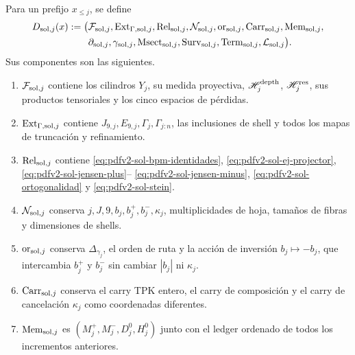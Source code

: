 Para un prefijo \(x_{\leq j}\), se define
\begin{equation}\label{eq:pdfv2-sol-d-package}
 \begin{aligned}
 D_{{\rm sol},j}(x):=\bigl(&
 \mathcal F_{{\rm sol},j},
 \operatorname{Ext}_{\Gamma,{\rm sol},j},
 \operatorname{Rel}_{{\rm sol},j},
 \mathcal N_{{\rm sol},j},
 \operatorname{or}_{{\rm sol},j},
 \operatorname{Carr}_{{\rm sol},j},
 \operatorname{Mem}_{{\rm sol},j},\\
 &\partial_{{\rm sol},j},
 \gamma_{{\rm sol},j},
 \operatorname{Msect}_{{\rm sol},j},
 \operatorname{Surv}_{{\rm sol},j},
 \operatorname{Term}_{{\rm sol},j},
 \mathcal L_{{\rm sol},j}\bigr).
 \end{aligned}
\end{equation}
Sus componentes son las siguientes.
\begin{enumerate}
 \item \(\mathcal F_{{\rm sol},j}\) contiene los cilindros \(Y_j\), su medida
       proyectiva, \(\mathscr H_j^{\rm depth}\),
       \(\mathscr H_j^{\rm res}\), sus productos tensoriales y los cinco
       espacios de pérdidas.
 \item \(\operatorname{Ext}_{\Gamma,{\rm sol},j}\) contiene
       \(J_{9,j},E_{9,j},\Gamma_j,\Gamma_{j:n}\), las inclusiones de shell y
       todos los mapas de truncación y refinamiento.
 \item \(\operatorname{Rel}_{{\rm sol},j}\) contiene
       \eqref{eq:pdfv2-sol-bpm-identidades},
       \eqref{eq:pdfv2-sol-ej-projector},
       \eqref{eq:pdfv2-sol-jensen-plus}--
       \eqref{eq:pdfv2-sol-jensen-minus},
       \eqref{eq:pdfv2-sol-ortogonalidad} y
       \eqref{eq:pdfv2-sol-stein}.
 \item \(\mathcal N_{{\rm sol},j}\) conserva
       \(j,J,9,b_j,b_j^+,b_j^-,\kappa_j\), multiplicidades de hoja, tamaños
       de fibras y dimensiones de shells.
 \item \(\operatorname{or}_{{\rm sol},j}\) conserva
       \(\Delta_{\gamma_j}\), el orden de ruta y la acción de inversión
       \(b_j\mapsto-b_j\), que intercambia \(b_j^+\) y \(b_j^-\) sin cambiar
       \(|b_j|\) ni \(\kappa_j\).
 \item \(\operatorname{Carr}_{{\rm sol},j}\) conserva el carry TPK entero,
       el carry de composición y el carry de cancelación \(\kappa_j\) como
       coordenadas diferentes.
 \item \(\operatorname{Mem}_{{\rm sol},j}\) es
       \((M_j^+,M_j^-,D_j^0,H_j^0)\) junto con el ledger ordenado de todos los
       incrementos anteriores.

\end{enumerate}
